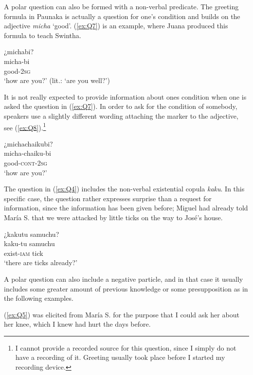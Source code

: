 A polar question can also be formed with a non-verbal predicate. The greeting formula in Paunaka is actually a question for one’s condition and builds on the adjective \textit{micha} ‘good’. (\ref{ex:Q7}) is an example, where Juana produced this formula to teach Swintha.

\ea\label{ex:Q7}
\begingl
\glpreamble ¿michabi?\\
\gla micha-bi\\
\glb good-2\textsc{sg}\\
\glft ‘how are you?’ (lit.: ‘are you well?’)
\endgl
\trailingcitation{[jxx-n101013s-1.081]}
\xe

It is not really expected to provide information about ones condition when one is asked the question in (\ref{ex:Q7}). In order to ask for the condition of somebody, speakers use a slightly different wording attaching the  marker to the adjective, see (\ref{ex:Q8}).\footnote{I cannot provide a recorded source for this question, since I simply do not have a recording of it. Greeting usually took place before I started my recording device.}

\ea\label{ex:Q8}
\begingl
\glpreamble ¿michachaikubi?\\
\gla micha-chaiku-bi\\
\glb good-\textsc{cont}-2\textsc{sg}\\
\glft ‘how are you?’
\endgl
\xe

The question in (\ref{ex:Q4}) includes the non-verbal existential copula \textit{kaku}. In this specific case, the question rather expresses surprise than a request for information, since the information has been given before; Miguel had already told María S. that we were attacked by little ticks on the way to José’s house. 

\ea\label{ex:Q4}
\begingl
\glpreamble ¿kakutu samuchu?\\
\gla kaku-tu samuchu\\
\glb exist-\textsc{iam} tick\\
\glft ‘there are ticks already?’
\endgl
\trailingcitation{[mrx-c120509l.149]}
\xe

A polar question can also include a negative particle, and in that case it usually includes some greater amount of previous knowledge or some presupposition as  in the following examples.

(\ref{ex:Q5}) was elicited from María S. for the purpose that I could ask her about her knee, which I knew had hurt the days before.

